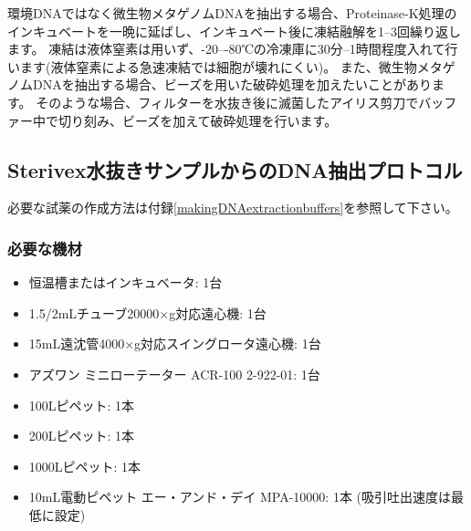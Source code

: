 \documentclass[titlepage,10pt,a4paper,uplatex]{jsbook}
\begin{document}
環境DNAではなく微生物メタゲノムDNAを抽出する場合、Proteinase-K処理のインキュベートを一晩に延ばし、インキュベート後に凍結融解を1--3回繰り返します。
凍結は液体窒素は用いず、{-20}--{-80}℃の冷凍庫に30分--1時間程度入れて行います(液体窒素による急速凍結では細胞が壊れにくい)。
また、微生物メタゲノムDNAを抽出する場合、ビーズを用いた破砕処理を加えたいことがあります。
そのような場合、フィルターを水抜き後に滅菌したアイリス剪刀でバッファー中で切り刻み、ビーズを加えて破砕処理を行います。

\subsection{Sterivex水抜きサンプルからのDNA抽出プロトコル}

必要な試薬の作成方法は付録\ref{makingDNAextractionbuffers}を参照して下さい。

\subsubsection{必要な機材}
\begin{itemize}
\item 恒温槽またはインキュベータ: 1台
\item 1.5/2mLチューブ20000×g対応遠心機: 1台
\item 15mL遠沈管4000×g対応スイングロータ遠心機: 1台
\item アズワン ミニローテーター ACR-100 2-922-01: 1台
\item 100{\textmu}Lピペット: 1本
\item 200{\textmu}Lピペット: 1本
\item 1000{\textmu}Lピペット: 1本
\item 10mL電動ピペット エー・アンド・デイ MPA-10000: 1本 (吸引吐出速度は最低に設定)
\end{itemize}
\end{document}
